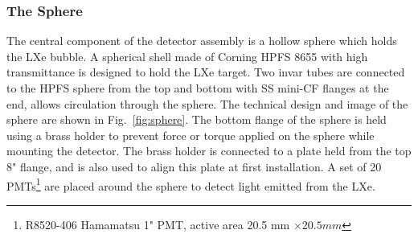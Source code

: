 \subsubsection{The Sphere}
\label{subsubsec:sphere}

The central component of the detector assembly is a hollow sphere 
which holds the LXe bubble. A spherical shell made of Corning HPFS 8655 with high transmittance is 
designed to hold the LXe target. Two invar tubes 
are connected to the HPFS sphere from the top and bottom with 
SS mini-CF flanges at the end,  allows  circulation  through 
the sphere. The technical design and image of the sphere are shown in Fig.~\ref{fig:sphere}. 
The bottom flange of the sphere is held using a brass holder to prevent 
force or torque applied on the sphere while mounting the detector. The 
brass holder is connected to a plate held from the top 8" flange, and is 
also used to align this plate at first installation. A set of 20 
PMTs\footnote{R8520-406 Hamamatsu 1" PMT, active area 20.5 mm $\times 20.5 mm$} 
are placed around the sphere to detect light emitted from the LXe.


